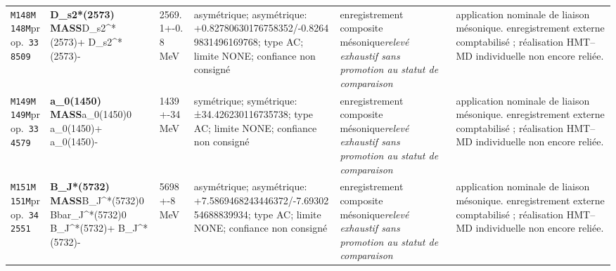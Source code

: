 \begin{landscape}
\begin{longtable}{L{1.85cm}L{4.45cm}L{2.35cm}L{4.05cm}L{3.35cm}L{7.15cm}}
\texttt{M148}\newline \texttt{M148M}\newline prop.\ \texttt{338509} & \textbf{D\_\allowbreak{}s2*(2573) MASS}\newline D\_\allowbreak{}s2\textasciicircum{}*(2573)+ \textbar{}\allowbreak{} D\_\allowbreak{}s2\textasciicircum{}*(2573)- & 2569.1+-0.8\,MeV & asymétrique; asymétrique: +0.82780630176758352/-0.82649831496169768; type AC; limite NONE; confiance non consigné & enregistrement composite mésonique\newline \emph{relevé exhaustif sans promotion au statut de comparaison} & application nominale de liaison mésonique. enregistrement externe comptabilisé ; réalisation HMT--MD individuelle non encore reliée. \\
\texttt{M149}\newline \texttt{M149M}\newline prop.\ \texttt{334579} & \textbf{a\_\allowbreak{}0(1450) MASS}\newline a\_\allowbreak{}0(1450)0 \textbar{}\allowbreak{} a\_\allowbreak{}0(1450)+ \textbar{}\allowbreak{} a\_\allowbreak{}0(1450)- & 1439+-34\,MeV & symétrique; symétrique: ±34.426230116735738; type AC; limite NONE; confiance non consigné & enregistrement composite mésonique\newline \emph{relevé exhaustif sans promotion au statut de comparaison} & application nominale de liaison mésonique. enregistrement externe comptabilisé ; réalisation HMT--MD individuelle non encore reliée. \\
\texttt{M151}\newline \texttt{M151M}\newline prop.\ \texttt{342551} & \textbf{B\_\allowbreak{}J*(5732) MASS}\newline B\_\allowbreak{}J\textasciicircum{}*(5732)0 \textbar{}\allowbreak{} Bbar\_\allowbreak{}J\textasciicircum{}*(5732)0 \textbar{}\allowbreak{} B\_\allowbreak{}J\textasciicircum{}*(5732)+ \textbar{}\allowbreak{} B\_\allowbreak{}J\textasciicircum{}*(5732)- & 5698+-8\,MeV & asymétrique; asymétrique: +7.5869468243446372/-7.6930254688839934; type AC; limite NONE; confiance non consigné & enregistrement composite mésonique\newline \emph{relevé exhaustif sans promotion au statut de comparaison} & application nominale de liaison mésonique. enregistrement externe comptabilisé ; réalisation HMT--MD individuelle non encore reliée. \\

\end{longtable}
\end{landscape}
